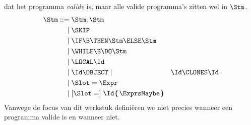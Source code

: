 dat het programma \emph{valide} is, maar alle valide programma's zitten wel in $\Stm$.
\begin{align*}
  \Stm \GrammarDef \Stm; \Stm \\
  \GrammarOr \SKIP \\
  \GrammarOr \IF \B \THEN \Stm \ELSE \Stm \\
  \GrammarOr \WHILE \B \DO \Stm \\
  \GrammarOr \LOCAL \Id \\
  \GrammarOr \Id \OBJECT
  \GrammarOr \Id \CLONES \Id \\
  \GrammarOr \Slot = \Expr \\
  \GrammarOr \GrammarOpt{\Slot =} \Id\,\pmb{(}\,\ExprsMaybe\,\pmb{)} \\
\end{align*}
Vanwege de focus van dit werkstuk definiëren we niet precies wanneer een programma valide is en wanneer niet.

